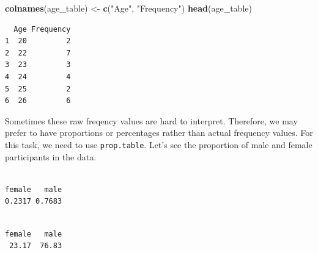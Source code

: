 \documentclass[]{book}
\newenvironment{Shaded}{\begin{snugshade}}{\end{snugshade}}
\newcommand{\CommentTok}[1]{\textcolor[rgb]{0.56,0.35,0.01}{\textit{#1}}}
\newcommand{\DecValTok}[1]{\textcolor[rgb]{0.00,0.00,0.81}{#1}}
\newcommand{\KeywordTok}[1]{\textcolor[rgb]{0.13,0.29,0.53}{\textbf{#1}}}
\newcommand{\NormalTok}[1]{#1}
\newcommand{\OperatorTok}[1]{\textcolor[rgb]{0.81,0.36,0.00}{\textbf{#1}}}
\newcommand{\StringTok}[1]{\textcolor[rgb]{0.31,0.60,0.02}{#1}}
\begin{document}
\begin{Shaded}
\begin{Highlighting}[]
\KeywordTok{colnames}\NormalTok{(age_table) <-}\StringTok{ }\KeywordTok{c}\NormalTok{(}\StringTok{"Age"}\NormalTok{, }\StringTok{"Frequency"}\NormalTok{)}
\KeywordTok{head}\NormalTok{(age_table)}
\end{Highlighting}
\end{Shaded}

\begin{verbatim}
  Age Frequency
1  20         2
2  22         7
3  23         3
4  24         4
5  25         2
6  26         6
\end{verbatim}

Sometimes these raw freqency values are hard to interpret. Therefore, we may prefer to have proportions or percentages rather than actual frequency values. For this task, we need to use \texttt{prop.table}. Let's see the proportion of male and female participants in the data.

\begin{Shaded}
\end{Shaded}

\begin{verbatim}

female   male 
0.2317 0.7683 
\end{verbatim}

\begin{Shaded}
\end{Shaded}

\begin{verbatim}

female   male 
 23.17  76.83 
\end{verbatim}

\begin{Shaded}
\end{Shaded}
\end{document}
